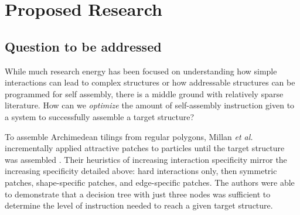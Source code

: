 \section{Proposed Research}




\subsection*{Question to be addressed}

While much research energy has been focused on understanding how simple interactions can lead to complex structures or how addressable structures can be programmed for self assembly, there is a middle ground with relatively sparse literature.
How can we \textit{optimize} the amount of self-assembly instruction given to a system to successfully assemble a target structure?

To assemble Archimedean tilings from regular polygons, Millan \textit{et al.} incrementally applied attractive patches to particles until the target structure was assembled \cite{Millan_2014_ACSNano}.
Their heuristics of increasing interaction specificity mirror the increasing specificity detailed above: hard interactions only, then symmetric patches, shape-specific patches, and edge-specific patches.
The authors were able to demonstrate that a decision tree with just three nodes was sufficient to determine the level of instruction needed to reach a given target structure.

